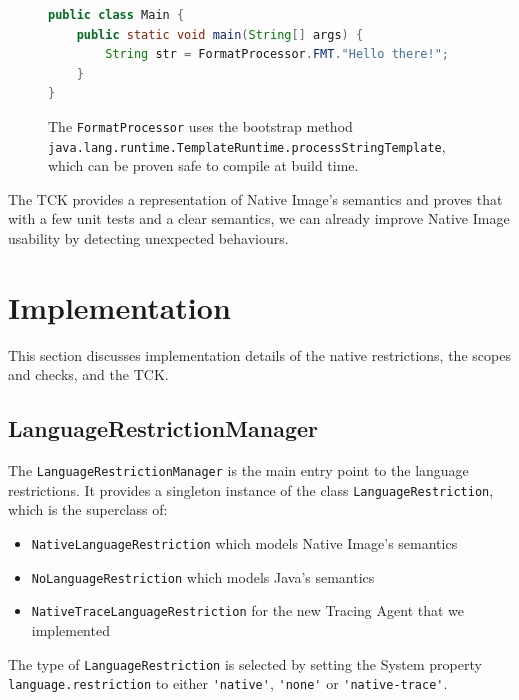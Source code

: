 \begin{figure}[ht]
    \centering
\begin{lstlisting}[language=Java]
public class Main {
    public static void main(String[] args) {
        String str = FormatProcessor.FMT."Hello there!";
    }
}
\end{lstlisting}
    \caption{The \texttt{FormatProcessor} uses the bootstrap method \texttt{java.lang.runtime.TemplateRuntime.processStringTemplate}, which can be proven safe to compile at build time. }
    \label{fig:format_processor}
\end{figure}

The TCK provides a representation of Native Image's semantics and proves that with a few unit tests and a clear semantics, we can already improve Native Image usability by detecting unexpected behaviours.


\chapter{Implementation}

This section discusses implementation details of the native restrictions, the scopes and checks, and the TCK.

\section{LanguageRestrictionManager}
The \verb|LanguageRestrictionManager| is the main entry point to the language restrictions. It provides a singleton instance of the class \verb|LanguageRestriction|, which is the superclass of: 
\begin{itemize}
    \item \texttt{NativeLanguageRestriction} which models Native Image's semantics
    \item \texttt{NoLanguageRestriction} which  models Java's semantics
    \item \texttt{NativeTraceLanguageRestriction} for the new Tracing Agent that we implemented
\end{itemize}
The type of \verb|LanguageRestriction| is selected by setting the System property \verb|language.restriction| to either \verb|'native'|, \verb|'none'| or \verb|'native-trace'|. 

